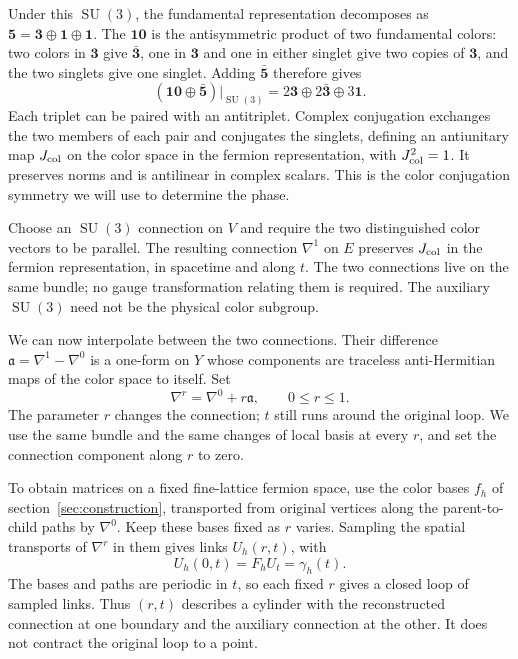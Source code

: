 \documentclass[11pt,a4paper]{article}
\theoremstyle{remark}
\DeclareMathOperator{\SU}{SU}
\begin{document}
Under this $\SU(3)$, the fundamental representation decomposes as
$\mathbf5=\mathbf3\oplus\mathbf1\oplus\mathbf1$. The $\mathbf{10}$
is the antisymmetric product of two fundamental colors: two colors in
$\mathbf3$ give $\bar{\mathbf3}$, one in $\mathbf3$ and one in either
singlet give two copies of $\mathbf3$, and the two singlets give one
singlet. Adding $\bar{\mathbf5}$ therefore gives
\begin{equation}
 (\mathbf{10}\oplus\bar{\mathbf5})|_{\SU(3)}
       =2\mathbf3\oplus2\bar{\mathbf3}\oplus3\mathbf1 .
 \label{eq:real-restriction}
\end{equation}
Each triplet can be paired with an antitriplet. Complex conjugation
exchanges the two members of each pair and conjugates the singlets,
defining an antiunitary map $J_{\rm col}$ on the color space in the
fermion representation, with $J_{\rm col}^2=1$. It preserves norms and
is antilinear in complex scalars. This is the color conjugation symmetry
we will use to determine the phase.

Choose an $\SU(3)$ connection on $V$ and require the two distinguished
color vectors to be parallel. The resulting connection $\nabla^1$ on $E$
preserves $J_{\rm col}$ in the fermion representation, in spacetime and
along $t$. The two connections live on the same bundle; no gauge transformation
relating them is required. The auxiliary
$\SU(3)$ need not be the physical color subgroup.

We can now interpolate between the two connections. Their difference
$\mathfrak a=\nabla^1-\nabla^0$ is a one-form on $Y$ whose components
are traceless anti-Hermitian maps of the color space to itself. Set
\begin{equation}
 \nabla^r=\nabla^0+r\mathfrak a,\qquad 0\le r\le1.
\end{equation}
The parameter $r$ changes the connection; $t$ still runs around the
original loop. We use the same bundle and the same changes of local
basis at every $r$, and set the connection component along $r$ to zero.

To obtain matrices on a fixed fine-lattice fermion space, use the color
bases $f_h$ of section~\ref{sec:construction}, transported from original
vertices along the parent-to-child paths by $\nabla^0$. Keep these bases
fixed as $r$ varies. Sampling the spatial transports of $\nabla^r$ in
them gives links $U_h(r,t)$, with
\begin{equation}
 U_h(0,t)=F_hU_t=\gamma_h(t).
\end{equation}
The bases and paths are periodic in $t$, so each fixed $r$ gives a closed
loop of sampled links. Thus $(r,t)$ describes a cylinder with the
reconstructed connection at one boundary and the auxiliary connection
at the other. It does not contract the original loop to a point.
\end{document}
